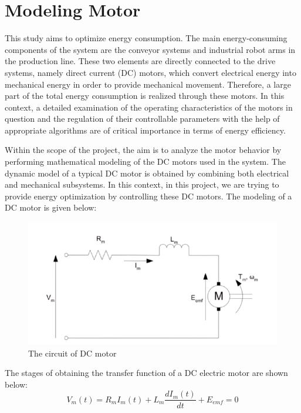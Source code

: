 \medskip


\section{Modeling Motor}
This study aims to optimize energy consumption. The main energy-consuming components of the system are the conveyor systems and industrial robot arms in the production line. These two elements are directly connected to the drive systems, namely direct current (DC) motors, which convert electrical energy into mechanical energy in order to provide mechanical movement. Therefore, a large part of the total energy consumption is realized through these motors. In this context, a detailed examination of the operating characteristics of the motors in question and the regulation of their controllable parameters with the help of appropriate algorithms are of critical importance in terms of energy efficiency.

Within the scope of the project, the aim is to analyze the motor behavior by performing mathematical modeling of the DC motors used in the system.
The dynamic model of a typical DC motor is obtained by combining both electrical and mechanical subsystems.
In this context, in this project, we are trying to provide energy optimization by controlling these DC motors. The modeling of a DC motor is given below:

\begin{figure}[H]
    \centering
    \includegraphics[width=0.8\columnwidth]{imgs/DC motor circuit.png}
    \caption[Short description for list of figures]{The circuit of DC motor }
    \label{fig-magnitude}
    \end{figure}%

    The stages of obtaining the transfer function of a DC electric motor are shown below:
    \begin{equation}
        V_m(t) = R_m I_m(t) + L_m \frac{d I_m(t)}{dt} + E_{emf} = 0
        \label{eq:dc_motor_voltage}
        \end{equation}


